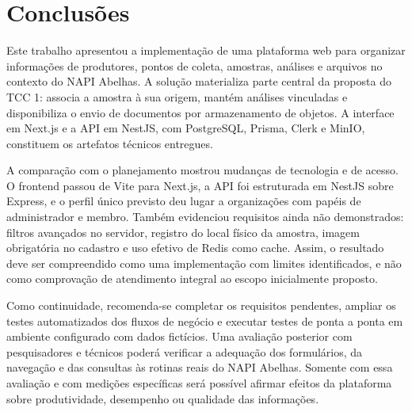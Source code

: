 \chapter{Conclusões}
\label{chap:conclusao}

Este trabalho apresentou a implementação de uma plataforma web para organizar informações de produtores, pontos de coleta, amostras, análises e arquivos no contexto do NAPI Abelhas. A solução materializa parte central da proposta do TCC 1: associa a amostra à sua origem, mantém análises vinculadas e disponibiliza o envio de documentos por armazenamento de objetos. A interface em Next.js e a API em NestJS, com PostgreSQL, Prisma, Clerk e MinIO, constituem os artefatos técnicos entregues.

A comparação com o planejamento mostrou mudanças de tecnologia e de acesso. O frontend passou de Vite para Next.js, a API foi estruturada em NestJS sobre Express, e o perfil único previsto deu lugar a organizações com papéis de administrador e membro. Também evidenciou requisitos ainda não demonstrados: filtros avançados no servidor, registro do local físico da amostra, imagem obrigatória no cadastro e uso efetivo de Redis como cache. Assim, o resultado deve ser compreendido como uma implementação com limites identificados, e não como comprovação de atendimento integral ao escopo inicialmente proposto.

Como continuidade, recomenda-se completar os requisitos pendentes, ampliar os testes automatizados dos fluxos de negócio e executar testes de ponta a ponta em ambiente configurado com dados fictícios. Uma avaliação posterior com pesquisadores e técnicos poderá verificar a adequação dos formulários, da navegação e das consultas às rotinas reais do NAPI Abelhas. Somente com essa avaliação e com medições específicas será possível afirmar efeitos da plataforma sobre produtividade, desempenho ou qualidade das informações.
